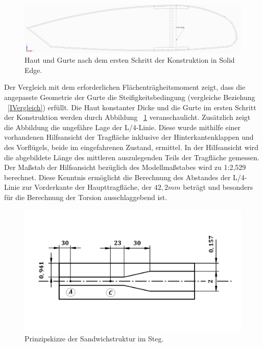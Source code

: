 \begin{figure}
	\includegraphics[width=1.0\textwidth]{Bilder/Kontur.jpg}
	\caption{Haut und Gurte nach dem ersten Schritt der Konstruktion in Solid Edge.}
	\label{fig: Kontur}
\end{figure} 
Der Vergleich mit dem erforderlichen Flächenträgheitsmoment zeigt, dass die angepasste Geometrie der Gurte die Steifigkeitsbedingung (vergleiche Beziehung ~\ref{IVergleich}) erfüllt. Die Haut konstanter Dicke und die Gurte im ersten Schritt der Konstruktion werden durch Abbildung ~\ref{fig: Kontur} veranschaulicht. Zusätzlich zeigt die Abbildung die ungefähre Lage der L/4-Linie. Diese wurde mithilfe einer vorhandenen Hilfsansicht der Tragfläche inklusive der Hinterkantenklappen und des Vorflügels, beide im eingefahrenen Zustand, ermittel. In der Hilfsansicht wird die abgebildete Länge des mittleren auszulegenden Teils der Tragfläche gemessen. Der Maßstab der Hilfsansicht bezüglich des Modellmaßstabes wird zu 1:2,529 berechnet. Diese Kenntnis ermöglicht die Berechnung des Abstandes der L/4-Linie zur Vorderkante der Haupttragfläche, der $ 42,2mm $ beträgt und besonders für die Berechnung der Torsion ausschlaggebend ist.\\

\begin{figure}
	\includegraphics[width=1.0\textwidth]{Bilder/StegPrinzip.jpg}
	\caption{Prinzipskizze der Sandwichstruktur im Steg.}
	\label{fig: Steg}
\end{figure}

